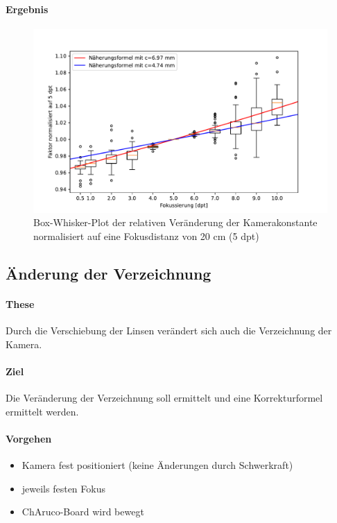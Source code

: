 \documentclass[./00PhotoBox.tex]{subfiles}
\begin{document}
\paragraph{Ergebnis}


\begin{figure}
    \centering
    \includegraphics[width=1\textwidth]{./img/fokus_faktor_diagramm_box.pdf}
    \centering
    \caption{Box-Whisker-Plot der relativen Veränderung der Kamerakonstante normalisiert auf eine Fokusdistanz von 20 cm (5 dpt)} %
    \label{img:fokus_faktor} %
\end{figure}



\subsection{Änderung der Verzeichnung}

\paragraph{These}
Durch die Verschiebung der Linsen verändert sich auch die Verzeichnung der Kamera.

\paragraph{Ziel}
Die Veränderung der Verzeichnung soll ermittelt und eine Korrekturformel ermittelt werden.

\paragraph{Vorgehen}

\begin{itemize}
    \item Kamera fest positioniert (keine Änderungen durch Schwerkraft)
    \item jeweils festen Fokus
    \item ChAruco-Board wird bewegt
\end{itemize}
\end{document}
